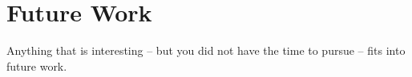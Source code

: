 
\chapter{Future Work}
\label{sec:futurework}

Anything that is interesting -- but you did not have the time to pursue -- fits into future work.